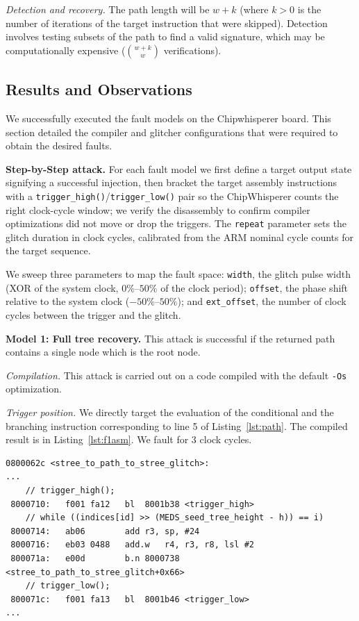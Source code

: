 \noindent\textit{Detection and recovery.} The path length will be $w+k$ (where $k > 0$ is the number of iterations of the target instruction that were skipped). Detection involves testing subsets of the path to find a valid signature, which may be computationally expensive ($ \binom{w+k}{w} $ verifications).




\subsection{Results and Observations}

We successfully executed the fault models on the Chipwhisperer board. This section detailed the compiler and glitcher configurations that were required to obtain the desired faults.

\noindent\textbf{Step-by-Step attack.}
For each fault model we first define a target output state signifying a
successful injection, then bracket the target assembly instructions with a
\texttt{trigger\_high()}/\texttt{trigger\_low()} pair so the ChipWhisperer
counts the right clock-cycle window; we verify the disassembly to confirm
compiler optimizations did not move or drop the triggers. The \texttt{repeat}
parameter sets the glitch duration in clock cycles, calibrated from the ARM
nominal cycle counts for the target sequence.

We sweep three parameters to map the fault space: \texttt{width}, the glitch
pulse width (XOR of the system clock, $0\%$--$50\%$ of the clock period);
\texttt{offset}, the phase shift relative to the system clock
($-50\%$--$50\%$); and \texttt{ext\_offset}, the number of clock cycles between
the trigger and the glitch.

\textbf{Model 1: Full tree recovery.}
This attack is successful if the returned path contains a 
single node which is the root node.

\textit{Compilation.} This attack is carried out on a 
code compiled with the default \texttt{-Os} optimization.

\textit{Trigger position.} We directly target the 
evaluation of the conditional and the branching 
instruction corresponding to line 5 of Listing~\ref{lst:path}. 
The compiled result is in Listing~\ref{lst:f1asm}. We fault for 3 
clock cycles.

\begin{lstlisting}[style=asmstyle, label=lst:f1asm, caption=Compiled trigger points for fault model 1.]
0800062c <stree_to_path_to_stree_glitch>:
...
    // trigger_high();
 8000710:	f001 fa12 	bl	8001b38 <trigger_high>
    // while ((indices[id] >> (MEDS_seed_tree_height - h)) == i)
 8000714:	ab06      	add	r3, sp, #24
 8000716:	eb03 0488 	add.w	r4, r3, r8, lsl #2
 800071a:	e00d      	b.n	8000738 <stree_to_path_to_stree_glitch+0x66>
    // trigger_low();
 800071c:	f001 fa13 	bl	8001b46 <trigger_low>
...
\end{lstlisting}

